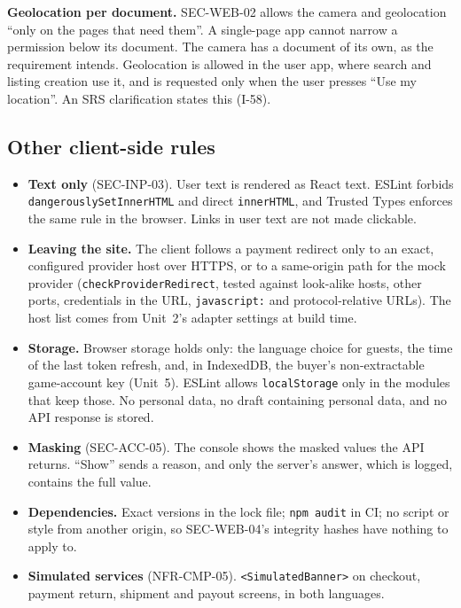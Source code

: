\documentclass[11pt,a4paper]{article}
\begin{document}
\textbf{Geolocation per document.} SEC-WEB-02 allows the camera and geolocation ``only on the pages that need them''. A single-page app cannot narrow a permission below its document. The camera has a document of its own, as the requirement intends. Geolocation is allowed in the user app, where search and listing creation use it, and is requested only when the user presses ``Use my location''. An SRS clarification states this (I-58).

\subsection{Other client-side rules}
\begin{itemize}[nosep]
  \item \textbf{Text only} (SEC-INP-03). User text is rendered as React text. ESLint forbids \texttt{dangerouslySetInnerHTML} and direct \texttt{innerHTML}, and Trusted Types enforces the same rule in the browser. Links in user text are not made clickable.
  \item \textbf{Leaving the site.} The client follows a payment redirect only to an exact, configured provider host over HTTPS, or to a same-origin path for the mock provider (\texttt{checkProviderRedirect}, tested against look-alike hosts, other ports, credentials in the URL, \texttt{javascript:} and protocol-relative URLs). The host list comes from Unit~2's adapter settings at build time.
  \item \textbf{Storage.} Browser storage holds only: the language choice for guests, the time of the last token refresh, and, in IndexedDB, the buyer's non-extractable game-account key (Unit~5). ESLint allows \texttt{localStorage} only in the modules that keep those. No personal data, no draft containing personal data, and no API response is stored.
  \item \textbf{Masking} (SEC-ACC-05). The console shows the masked values the API returns. ``Show'' sends a reason, and only the server's answer, which is logged, contains the full value.
  \item \textbf{Dependencies.} Exact versions in the lock file; \texttt{npm audit} in CI; no script or style from another origin, so SEC-WEB-04's integrity hashes have nothing to apply to.
  \item \textbf{Simulated services} (NFR-CMP-05). \texttt{<SimulatedBanner>} on checkout, payment return, shipment and payout screens, in both languages.
\end{itemize}
\end{document}
